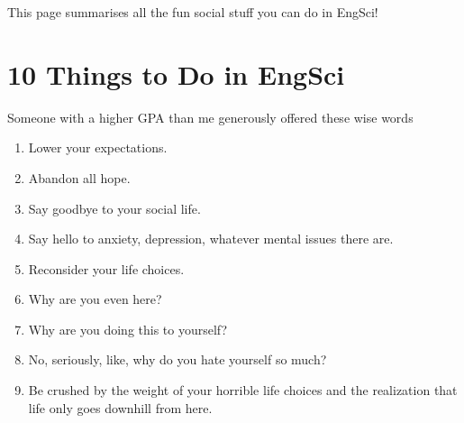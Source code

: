 This page summarises all the fun social stuff you can do in EngSci!

\section{10 Things to Do in EngSci}

Someone with a higher GPA than me generously offered these wise words

\begin{enumerate}
    \item Lower your expectations.
    \item Abandon all hope.
    \item Say goodbye to your social life.
    \item Say hello to anxiety, depression, whatever mental issues there are.
    \item Reconsider your life choices.
    \item Why are you even here?
    \item Why are you doing this to yourself?
    \item No, seriously, like, why do you hate yourself so much?
    \item Be crushed by the weight of your horrible life choices and the realization that life only goes downhill from here.
\end{enumerate}
